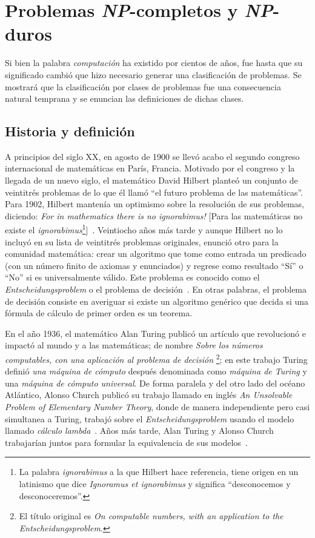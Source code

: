 \chapter{Problemas \textsl{NP}-completos y \textsl{NP}-duros}


Si bien la palabra \textit{computación} ha existido por cientos 
de años, fue hasta que su significado cambió 
que hizo necesario generar una clasificación de problemas. 
Se mostrará que la clasificación por clases de problemas fue una consecuencia 
natural temprana y se enuncian las definiciones de dichas clases.

\section{Historia y definición}
\label{sec:np-def}

A principios del siglo XX, en agosto de 1900 se llevó acabo el segundo
congreso internacional de matemáticas en París, Francia.
Motivado por el congreso y la llegada de un nuevo siglo, el matemático
David Hilbert planteó un conjunto de veintitrés problemas de lo que él llamó
``el futuro problema de las matemáticas''.
Para 1902, Hilbert mantenía un optimismo sobre la resolución de sus problemas,
diciendo: \textit{For in mathematics there is no ignorabimus!} [Para las matemáticas
no existe el \emph{ignorabimus}\footnote{La palabra \textit{ignorabimus} a la que
Hilbert hace referencia, tiene origen en un latinismo que dice
\textit{Ignoramus et ignorabimus} y significa  ``desconocemos y
desconoceremos''.}]~\cite{Grattan-Guinness}. Veintiocho años más tarde y aunque
Hilbert no lo incluyó en su lista de veintitrés problemas originales, enunció
otro para la comunidad matemática: crear un algoritmo que tome como entrada
un predicado (con un número finito de axiomas y enunciados) y regrese como
resultado ``Sí'' o ``No'' si es universalmente válido. Este problema es conocido
como el \textit{Entscheidungsproblem} o el problema de
decisión~\cite{hilbert1950principles}. En otras palabras, el problema de
decisión consiste en averiguar si existe un algoritmo genérico que decida
si una fórmula de cálculo de primer orden es un teorema.

En el año 1936, el matemático Alan Turing publicó un artículo que
revolucionó e impactó al mundo y a las matemáticas; de nombre \textit{
Sobre los números computables, con una aplicación al problema de decisión}
\footnote{El título original es \textit{On computable numbers, with an
application to the Entscheidungsproblem}.}; en este trabajo Turing
definió \textit{una máquina de cómputo} después denominada como \textit{
máquina de Turing} y una \textit{máquina de cómputo universal}. De forma
paralela y del otro lado del océano Atlántico, Alonso Church publicó su trabajo
llamado en inglés \textit{An Unsolvable Problem of Elementary Number Theory},
donde de manera independiente pero casi simultanea a Turing, trabajó sobre
el \emph{Entscheidungsproblem} usando el modelo llamado \textit{cálculo
lambda}~\cite{church1935unsolvable}. Años más tarde, Alan Turing y Alonso Church
trabajarían juntos para formular la equivalencia de sus modelos~\cite{sep-church-turing}.

